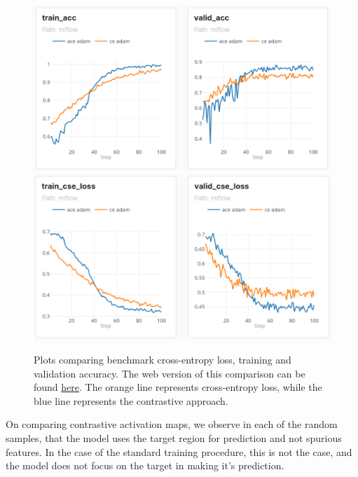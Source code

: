 \documentclass{article}
\theoremstyle{plain}
\theoremstyle{definition}
\theoremstyle{remark}
\begin{document}
\begin{figure}[H]
	\centering
	\includegraphics[width=.4\textwidth]{img/accuracy.png}
	\hspace{4em}
	\includegraphics[width=.4\textwidth]{img/loss.png}
	\caption{Plots comparing benchmark cross-entropy loss, training and validation accuracy. The web version of this comparison can be found \href{https://dagshub.com/jinensetpal/contrastive-optimization/experiments\#/compare?experiments=[\%22m_cea5cf4fcbbb4c3f984b2396927cf80c\%22,\%22m_101287828f604122a092a2501ec3facb\%22]}{here}. The orange line represents cross-entropy loss, while the blue line represents the contrastive approach.}
\end{figure}

On comparing contrastive activation maps, we observe in each of the random samples, that the model uses the target region for prediction and not spurious features. In the case of the standard training procedure, this is not the case, and the model does not focus on the target in making it's prediction.
\end{document}
